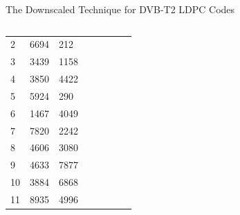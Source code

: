 \documentclass[11pt, aspectratio=169]{beamer}
\begin{document}
\begin{frame}{The Downscaled Technique for DVB-T2 LDPC Codes}
\begin{columns}
\begin{table}[tb]
\begin{adjustbox}{width=0.8\textwidth , totalheight=\baselineskip,keepaspectratio}
\begin{tabular}{|l|l|l|lllll}
		2                        & 6694                      & 212                       &                           &                           &                           &                           &                           \\ \cline{1-3}
		3                        & 3439                      & 1158                      &                           &                           &                           &                           &                           \\ \cline{1-3}
		4                        & 3850                      & 4422                      &                           &                           &                           &                           &                           \\ \cline{1-3}
		5                        & 5924                      & 290                       &                           &                           &                           &                           &                           \\ \cline{1-3}
		6                        & 1467                      & 4049                      &                           &                           &                           &                           &                           \\ \cline{1-3}
		7                        & 7820                      & 2242                      &                           &                           &                           &                           &                           \\ \cline{1-3}
		8                        & 4606                      & 3080                      &                           &                           &                           &                           &                           \\ \cline{1-3}
		9                        & 4633                      & 7877                      &                           &                           &                           &                           &                           \\ \cline{1-3}
		10                       & 3884                      & 6868                      &                           &                           &                           &                           &                           \\ \cline{1-3}
		11                       & 8935                      & 4996                      &                           &                           &                           &                           &                           \\ \cline{1-3}

\end{tabular}
\end{adjustbox}
\end{table}
\end{columns}
\end{frame}
\end{document}
